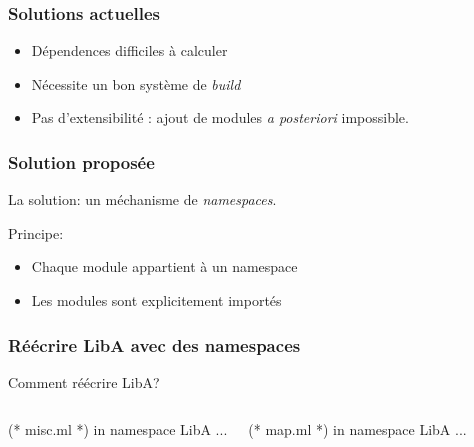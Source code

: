 \documentclass{beamer}
\begin{document}
\begin{frame}
\frametitle{Solutions actuelles}
\begin{itemize}[<+->]
\item Dépendences difficiles à calculer
\item Nécessite un bon système de \emph{build}
\item Pas d'extensibilité : ajout de modules \emph{a posteriori} impossible.
\end{itemize}
\end{frame}

\begin{frame}
\frametitle{Solution proposée}
La solution: un méchanisme de \emph{namespaces}.

\bigskip

Principe:
\begin{itemize}[<+->]
\item Chaque module appartient à un namespace
\item Les modules sont explicitement importés
\end{itemize}

\bigskip

\end{frame}

\begin{frame}[fragile]
\frametitle{Réécrire LibA avec des namespaces}

Comment réécrire LibA?

\pause

\begin{columns}%
    \begin{OCaml}
      (* misc.ml *)
      in namespace LibA
      ...
    \end{OCaml}

    \begin{OCaml}
      (* map.ml *)
      in namespace LibA
      ...
    \end{OCaml}
\end{columns}

\end{frame}
\end{document}
